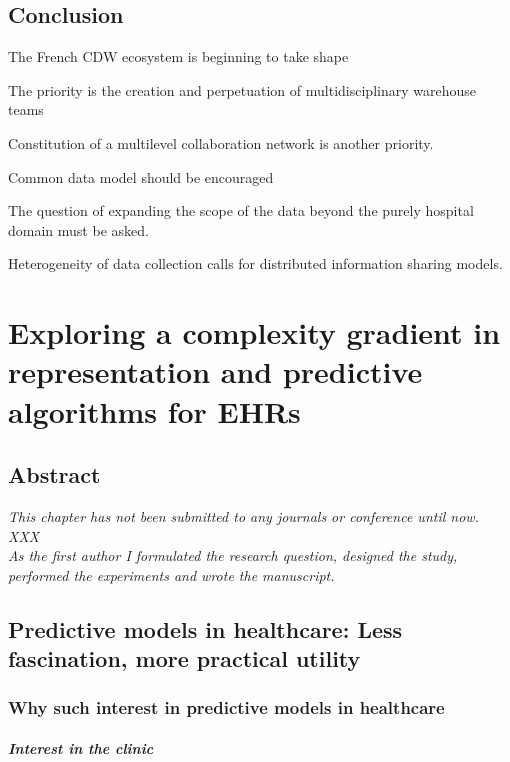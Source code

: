\documentclass{report}
\begin{document}
\section{Conclusion}\label{sec:cdw:conclusion}

The French CDW ecosystem is beginning to take shape

The priority is the creation and perpetuation of multidisciplinary warehouse teams

Constitution of a multilevel collaboration network is another priority.

Common data model should be encouraged

The question of expanding the scope of the data beyond the purely hospital domain must be asked.

Heterogeneity of data collection calls for distributed information sharing models.

\chapter{Exploring a complexity gradient in representation and predictive algorithms for EHRs}\label{chapter:predictive_models}
\section{Abstract}\label{sec:predictive_models:abstract}

\vfill
\textit{This chapter has not been submitted to any journals or conference until
  now.\\ XXX \\
  As the first author I formulated the research question, designed the study,
  performed the experiments and wrote the manuscript.}

\clearpage
\section{Predictive models in healthcare: Less fascination, more practical utility}\label{sec:predictive_models:motivation}

\subsection{Why such interest in predictive models in healthcare}\label{subsec:predictive_models:importance}

\paragraph{Interest in the clinic}
\end{document}
